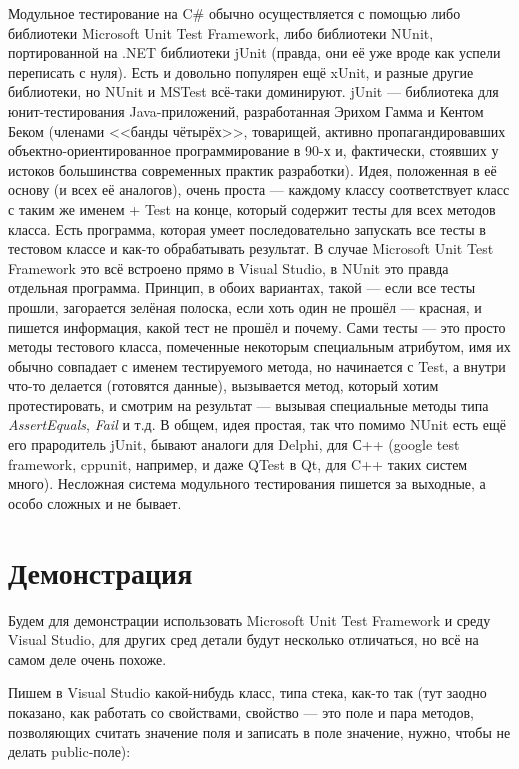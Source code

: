 \documentclass{../../text-style}
\begin{document}
Модульное тестирование на C\# обычно осуществляется с помощью либо библиотеки Microsoft Unit Test Framework, либо библиотеки NUnit, портированной на .NET библиотеки jUnit (правда, они её уже вроде как успели переписать с нуля). Есть и довольно популярен ещё xUnit, и разные другие библиотеки, но NUnit и MSTest всё-таки доминируют. jUnit --- библиотека для юнит-тестирования Java-приложений, разработанная Эрихом Гамма и Кентом Беком (членами <<банды чётырёх>>, товарищей, активно пропагандировавших объектно-ориентированное программирование в 90-х и, фактически, стоявших у истоков большинства современных практик разработки). Идея, положенная в её основу (и всех её аналогов), очень проста --- каждому классу соответствует класс с таким же именем + Test на конце, который содержит тесты для всех методов класса. Есть программа, которая умеет последовательно запускать все тесты в тестовом классе и как-то обрабатывать результат. В случае Microsoft Unit Test Framework это всё встроено прямо в Visual Studio, в NUnit это правда отдельная программа. Принцип, в обоих вариантах, такой --- если все тесты прошли, загорается зелёная полоска, если хоть один не прошёл --- красная, и пишется информация, какой тест не прошёл и почему. Сами тесты --- это просто методы тестового класса, помеченные некоторым специальным атрибутом, имя их обычно совпадает с именем тестируемого метода, но начинается с Test, а внутри что-то делается (готовятся данные), вызывается метод, который хотим протестировать, и смотрим на результат --- вызывая специальные методы типа \textit{AssertEquals}, \textit{Fail} и т.д. В общем, идея простая, так что помимо NUnit есть ещё его прародитель jUnit, бывают аналоги для Delphi, для С++ (google test framework, cppunit, например, и даже QTest в Qt, для C++ таких систем много). Несложная система модульного тестирования пишется за выходные, а особо сложных и не бывает.

\section{Демонстрация}

Будем для демонстрации использовать Microsoft Unit Test Framework и среду Visual Studio, для других сред детали будут несколько отличаться, но всё на самом деле очень похоже.

Пишем в Visual Studio какой-нибудь класс, типа стека, как-то так (тут заодно показано, как работать со свойствами, свойство --- это поле и пара методов, позволяющих считать значение поля и записать в поле значение, нужно, чтобы не делать public-поле):
\end{document}
